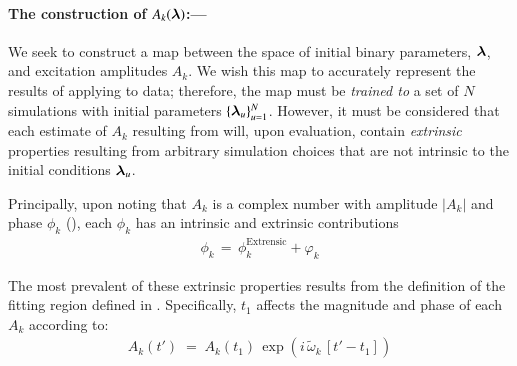 \documentclass[twocolumn,prd,floatfix,preprintnumbers,a4paper,nofootinbib,superscriptaddress]{revtex4-1}
\newcommand{\cw}{\tilde{\omega}}
\begin{document}
\paragraph{The construction of $A_k({\bm{\lambda}})$:---}
%
\par We seek to construct a map between the space of initial binary parameters, ${\bm{\lambda}}$, and \qnm{} excitation amplitudes $A_k$.
%
We wish this map to accurately represent the results of applying  to \nr{} data; therefore, the map must be \textit{trained to} a set of $N$ \nr{} simulations with initial parameters $\{{\bm{\lambda}}_u\}_{u=1}^{N}$.
%
However, it must be considered that each estimate of $A_k$ resulting from  will, upon evaluation, contain \textit{extrinsic} properties resulting from arbitrary simulation choices that are not intrinsic to the initial conditions ${\bm{\lambda}}_u$.
%
\par Principally, upon noting that $A_k$ is a complex number with amplitude $|A_k|$ and phase $\phi_k$ (), each $\phi_k$ has an intrinsic and extrinsic contributions
%
\begin{align}
	\phi_k \, = \, \phi_{k}^{\mathrm{Extrensic}} + \varphi_k
\end{align}
%
\par The most prevalent of these extrinsic properties results from the definition of the fitting region defined in .
%
Specifically, $t_1$ affects the magnitude and phase of each $A_k$ according to:
%
\begin{align}
	A_{k}(t') \; = \;A_{k}(t_1) \, \exp( i \, \cw_{k} \, [t'-t_1] )
\end{align}
%

%
\end{document}
